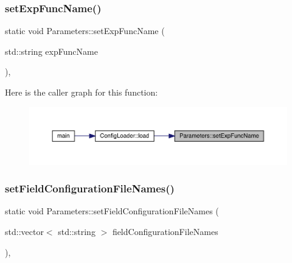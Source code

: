 \subsubsection{\texorpdfstring{setExpFuncName()}{setExpFuncName()}}
{\footnotesize\ttfamily static void Parameters\+::set\+Exp\+Func\+Name (\begin{DoxyParamCaption}\item[{std\+::string}]{exp\+Func\+Name }\end{DoxyParamCaption})\hspace{0.3cm}{\ttfamily [inline]}, {\ttfamily [static]}}

Here is the caller graph for this function\+:\nopagebreak
\begin{figure}[H]
\begin{center}
\leavevmode
\includegraphics[width=350pt]{class_parameters_abbcb8f09dfec507ec29caa248819522b_icgraph}
\end{center}
\end{figure}
\mbox{\label{class_parameters_a4b1c5312603f90d04f1b6ed732528ae3}} 
\subsubsection{\texorpdfstring{setFieldConfigurationFileNames()}{setFieldConfigurationFileNames()}}
{\footnotesize\ttfamily static void Parameters\+::set\+Field\+Configuration\+File\+Names (\begin{DoxyParamCaption}\item[{std\+::vector$<$ std\+::string $>$}]{field\+Configuration\+File\+Names }\end{DoxyParamCaption})\hspace{0.3cm}{\ttfamily [inline]}, {\ttfamily [static]}}

\mbox{\label{class_parameters_a5afe30ba482014c176433bb183a68976}} 
